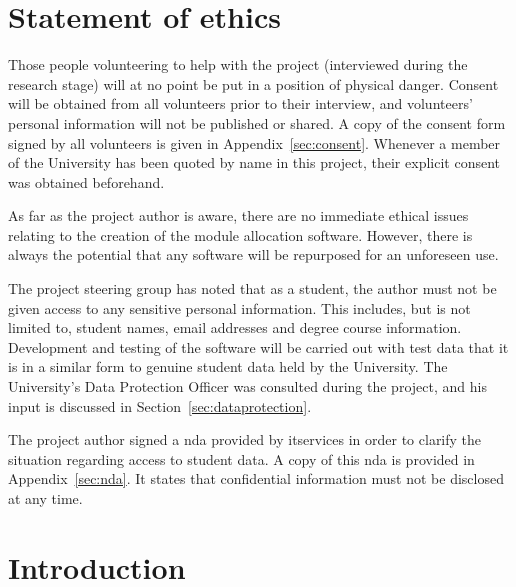 \documentclass[draft]{scrartcl}
\let\stdsection\section
\renewcommand\section{\clearpage\stdsection}
\begin{document}
\clearpage
\tableofcontents

\clearpage
\listoffigures

\section{Statement of ethics}


Those people volunteering to help with the project (interviewed during the
research stage) will at no point be put in a position of physical danger.
Consent will be obtained from all volunteers prior to their interview, and
volunteers' personal information will not be published or shared. A copy of
the consent form signed by all volunteers is given in
Appendix~\ref{sec:consent}. Whenever a member of the University has been
quoted by name in this project, their explicit consent was obtained
beforehand.


As far as the project author is aware, there are no immediate ethical issues
relating to the creation of the module allocation software. However, there is
always the potential that any software will be repurposed for an unforeseen
use.


The project steering group has noted that as a student, the author must not be
given access to any sensitive personal information. This includes, but is not
limited to, student names, email addresses and degree course information.
Development and testing of the software will be carried out with test data
that it is in a similar form to genuine student data held by the University.
The University's Data Protection Officer was consulted during the project, and
his input is discussed in Section~\ref{sec:dataprotection}.

The project author signed a \gls{nda} provided by \gls{itservices} in order to
clarify the situation regarding access to student data. A copy of this
\gls{nda} is provided in Appendix~\ref{sec:nda}. It states that confidential
information must not be disclosed at any time.

\section{Introduction}

\end{document}
